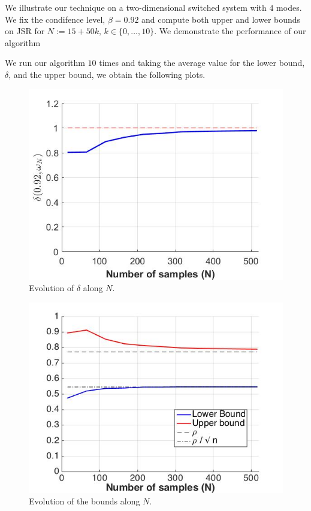 We illustrate our technique on a two-dimensional switched system with $4$ modes. We fix the condifence level, $\beta = 0.92$ and compute both upper and lower bounds on JSR for $N:=15+50k,\, k \in\{0, \ldots, 10\}.$ We demonstrate the performance of our algorithm 


We run our algorithm $10$ times and taking the average value for the lower bound, $\delta$, and the upper bound, we obtain the following plots.


\begin{figure}

\begin{center}
\includegraphics[scale=0.35]{delta1.jpg}
\caption{Evolution of $\delta$ along $N$.}
\end{center}
\end{figure}


\begin{figure}
\begin{center}
\includegraphics[scale=0.35]{bounds1.jpg}
\caption{Evolution of the bounds along $N$.}
\end{center}
\end{figure}

